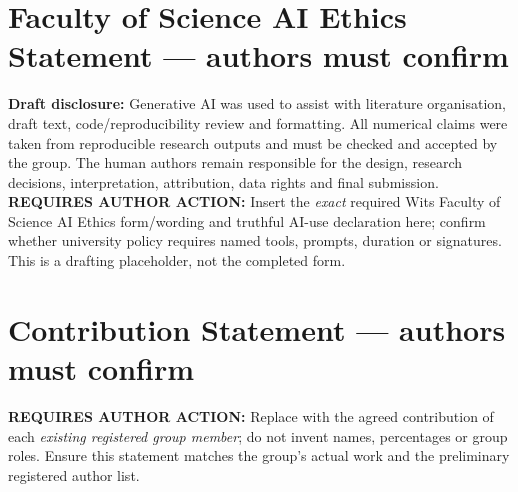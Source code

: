 \documentclass[10pt,letterpaper]{article}
\begin{document}
\clearpage


\clearpage

\clearpage
\section*{Faculty of Science AI Ethics Statement --- authors must confirm}
\noindent\textbf{Draft disclosure:} Generative AI was used to assist with literature organisation, draft text, code/reproducibility review and formatting. All numerical claims were taken from reproducible research outputs and must be checked and accepted by the group. The human authors remain responsible for the design, research decisions, interpretation, attribution, data rights and final submission.\\[4pt]
\textbf{REQUIRES AUTHOR ACTION:} Insert the \emph{exact} required Wits Faculty of Science AI Ethics form/wording and truthful AI-use declaration here; confirm whether university policy requires named tools, prompts, duration or signatures. This is a drafting placeholder, not the completed form.

\section*{Contribution Statement --- authors must confirm}
\noindent\textbf{REQUIRES AUTHOR ACTION:} Replace with the agreed contribution of each \emph{existing registered group member}; do not invent names, percentages or group roles. Ensure this statement matches the group's actual work and the preliminary registered author list.
\end{document}
